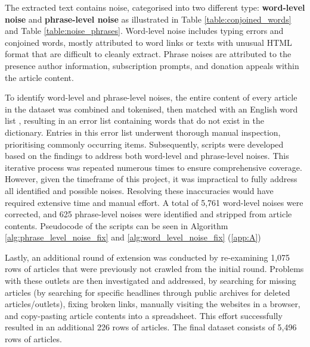 The extracted text contains noise, categorised into two different type: \textbf{word-level noise} and \textbf{phrase-level noise} as illustrated in Table \ref{table:conjoined_words} and Table \ref{table:noise_phrases}. Word-level noise includes typing errors and conjoined words, mostly attributed to word links or texts with unusual HTML format that are difficult to cleanly extract. Phrase noises are attributed to the presence author information, subscription prompts, and donation appeals within the article content.

To identify word-level and phrase-level noises, the entire content of every article in the dataset was combined and tokenised, then matched with an English word list \cite{dwyl-english-words}, resulting in an error list containing words that do not exist in the dictionary. Entries in this error list underwent thorough manual inspection, prioritising commonly occurring items. Subsequently, scripts were developed based on the findings to address both word-level and phrase-level noises. This iterative process was repeated numerous times to ensure comprehensive coverage. However, given the timeframe of this project, it was impractical to fully address all identified and possible noises. Resolving these inaccuracies would have required extensive time and manual effort. A total of 5,761 word-level noises were corrected, and 625 phrase-level noises were identified and stripped from article contents. Pseudocode of the scripts can be seen in Algorithm \ref{alg:phrase_level_noise_fix} and \ref{alg:word_level_noise_fix} (\ref{app:A})


Lastly, an additional round of extension was conducted by re-examining 1,075 rows of articles that were previously not crawled from the initial round. Problems with these outlets are then investigated and addressed, by searching for missing articles (by searching for specific headlines through public archives for deleted articles/outlets), fixing broken links, manually visiting the websites in a browser, and copy-pasting article contents into a spreadsheet. This effort successfully resulted in an additional 226 rows of articles. The final dataset consists of 5,496 rows of articles.

